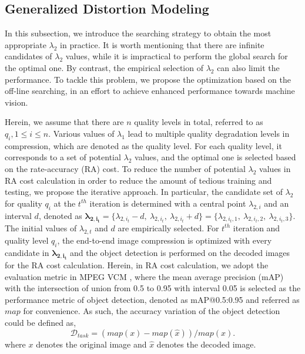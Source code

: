 \documentclass[transmag]{IEEEtran}
\begin{document}
\subsection{Generalized Distortion Modeling}
In this subsection, we introduce the searching strategy to obtain the most appropriate \(\lambda_2\) in practice.  
It is worth mentioning that there are infinite candidates of $\lambda_{2}$ values, while it is impractical to perform the global search for the optimal one. By contrast, the 
empirical selection of $\lambda_{2}$ can also limit the performance. To tackle this problem, we propose the  optimization based on the off-line searching, in an effort to achieve enhanced performance towards machine vision. 

Herein, we assume that there are \(n\) quality levels in total, referred to as $q_{i}, 1\leq i \leq n$. Various values of $\lambda_{1}$ lead to multiple quality degradation levels in compression, which are denoted as the quality level. For each quality level, it corresponds to a set of potential \(\lambda_2\) values, and the optimal one is selected based on the rate-accuracy (RA) cost. To reduce the number of potential \(\lambda_2\) values in RA cost calculation in order to reduce the amount of tedious training and testing, we propose the iterative approach. In particular, 
the candidate set of \(\lambda_2\) for quality $q_{i}$ at the $t^{th}$ iteration is determined with a central point $\lambda_{2,i}$ and an interval $d$, denoted as $\bm{\lambda_{2,i_{t}}}=\{\lambda_{2,i_{t}}-d,~\lambda_{2,i_{t}},~\lambda_{2,i_{t}}+d\}=\{\lambda_{2,i_{t},1},~\lambda_{2,i_{t},2},~\lambda_{2,i_{t},3}\}$. The initial values of $\lambda_{2,t}$ and $d$ are empirically selected.
For $t^{th}$ iteration and quality level $q_{i}$, the end-to-end image compression is optimized with every candidate in $\bm{\lambda_{2,i_{t}}}$ and the object detection is performed on the decoded images for the RA cost calculation. Herein, in RA cost calculation, we adopt the evaluation metric in MPEG VCM \cite{vcmtest}, where 
the mean average precision (mAP) with the intersection of union from 0.5 to 0.95 with interval 0.05 is selected as the performance metric of object detection, denoted as mAP@0.5:0.95 and referred as $map$ for convenience. As such, the accuracy variation of the object detection could be defined as,
\begin{equation}
    \mathcal{D}_{task}=(map(x)-map(\hat{x}))/map(x).
\end{equation}
where \(x\) denotes the original image and \(\hat{x}\) denotes the decoded image. 
\end{document}
